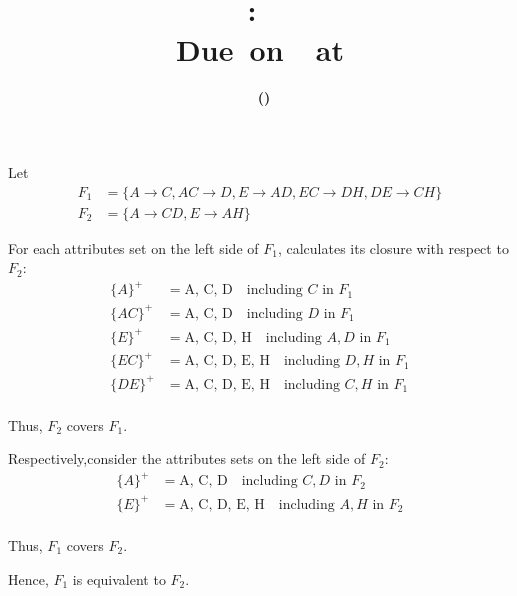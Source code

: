 \documentclass[11pt,letterpaper,titlepage,en-US]{article}
\title{
    \vspace{2in}
    \textmd{\textbf{\hmwkClassName \\\hmwkClass:\ \hmwkTitle}}\\
    \normalsize\vspace{0.1in}\small{Due\ on\ \DTMusedate{DueDate}\ at \DTMusetime{DueDate} }\\
    \vspace{0.1in}\large{\textit{\hmwkClassInstructor}}
    \vspace{3in}
}
\author{\textbf{\hmwkAuthorName\ \footnotesize{(\hmwkAuthorNetID)}} \\ \hmwkAuthorUTDEmail}
\date{}
\begin{document}
\maketitle


\pagebreak

\begin{homeworkProblem}
Let
\begin{align*}
    F_1 &= \{A \rightarrow C, AC \rightarrow D, E \rightarrow AD, EC \rightarrow DH, DE \rightarrow CH\} \\
    F_2 &= \{A \rightarrow CD, E \rightarrow AH\}
\end{align*}

For each attributes set on the left side of $F_1$, calculates its closure with respect to $F_2$:
\begin{align*}
    \{A\}^+ &= \text{A, C, D} \quad \text{including $C$ in $F_1$}\\
    \{AC\}^+ &= \text{A, C, D} \quad \text{including $D$ in $F_1$}\\
    \{E\}^+ &= \text{A, C, D, H} \quad \text{including $A, D$ in $F_1$}\\
    \{EC\}^+ &= \text{A, C, D, E, H} \quad \text{including $D, H$ in $F_1$}\\
    \{DE\}^+ &= \text{A, C, D, E, H} \quad \text{including $C, H$ in $F_1$}\\
\end{align*}

Thus, $F_2$ covers $F_1$.

Respectively,consider the attributes sets on the left side of $F_2$:
\begin{align*}
    \{A\}^+ &= \text{A, C, D} \quad \text{including $C, D$ in $F_2$} \\
    \{E\}^+ &= \text{A, C, D, E, H} \quad \text{including $A, H$ in $F_2$} \\
\end{align*}

Thus, $F_1$ covers $F_2$.

Hence, $F_1$ is equivalent to $F_2$.

\end{homeworkProblem}
\pagebreak
\end{document}
